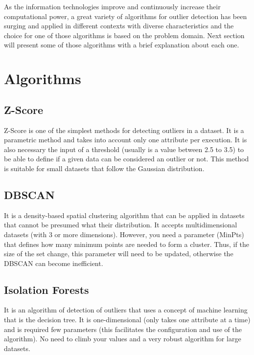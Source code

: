 As the information technologies improve and continuously increase their computational power, a great variety of algorithms for outlier detection has been surging and applied in different contexts with diverse characteristics and the choice for one of those algorithms is based on the problem domain. Next section will present some of those algorithms with a brief explanation about each one.

\section{Algorithms}

\subsection{Z-Score}

Z-Score is one of the simplest methods for detecting outliers in a dataset. It is a
parametric method and takes into account only one attribute per execution. It is also
necessary the input of a threshold (usually is a value between 2.5 to 3.5) to be able
to define if a given data can be considered an outlier or not. This method is suitable
for small datasets that follow the Gaussian distribution.

\subsection{DBSCAN}

It is a density-based spatial clustering algorithm \cite{Ester:1996:DAD:3001460.3001507} that can be applied in datasets that cannot be presumed what their distribution. It accepts multidimensional datasets (with 3 or more dimensions). However, you need a parameter (MinPts) that defines how many minimum points are needed to form a cluster. Thus, if the size of the set change, this parameter will need to be updated, otherwise the DBSCAN can become inefficient.

\subsection{Isolation Forests}

It is an algorithm of detection of outliers \cite{IsolationForests} that uses a concept of machine learning that
is the decision tree. It is one-dimensional (only takes one attribute at a time) and is
required few parameters (this facilitates the configuration and use of the algorithm).
No need to climb your values and a very robust algorithm for large datasets.

